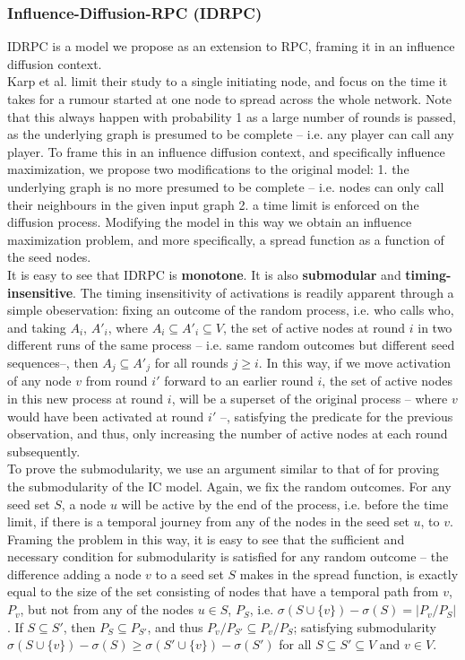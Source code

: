 \documentclass[twocolumn, 10pt]{article}
\begin{document}
\subsubsection{Influence-Diffusion-RPC (IDRPC)}
IDRPC is a model we propose as an extension to RPC, framing it in an influence diffusion context. \\
Karp et al. limit their study to a single initiating node, and focus on the time it takes for a rumour started at one node to spread across the whole network. Note that this always happen with probability 1 as a large number of rounds is passed, as the underlying graph is presumed to be complete -- i.e. any player can call any player. To frame this in an influence diffusion context, and specifically influence maximization, we propose two modifications to the original model: 1. the underlying graph is no more presumed to be complete -- i.e. nodes can only call their neighbours in the given input graph 2. a time limit is enforced on the diffusion process. Modifying the model in this way we obtain an influence maximization problem, and more specifically, a spread function as a function of the seed nodes. \\
It is easy to see that IDRPC is \textbf{monotone}. It is also \textbf{submodular} and \textbf{timing-insensitive}. The timing insensitivity of activations is readily apparent through a simple obeservation: fixing an outcome of the random process, i.e. who calls who, and taking $A_i$, $A'_i$, where $A_i \subseteq A'_i \subseteq V$, the set of active nodes at round $i$ in two different runs of the same process -- i.e. same random outcomes but different seed sequences--, then $A_j \subseteq A'_j$ for all rounds $j \geq i$. In this way, if we move activation of any node $v$ from round $i'$ forward to an earlier round $i$, the set of active nodes in this new process at round $i$, will be a superset of the original process -- where $v$ would have been activated at round $i'$ --, satisfying the predicate for the previous observation, and thus, only increasing the number of active nodes at each round subsequently. \\
To prove the submodularity, we use an argument similar to that of \cite{kempe} for proving the submodularity of the IC model. Again, we fix the random outcomes. For any seed set $S$, a node $u$ will be active by the end of the process, i.e. before the time limit, if there is a temporal journey from any of the nodes in the seed set $u$, to $v$. Framing the problem in this way, it is easy to see that the sufficient and necessary condition for submodularity is satisfied for any random outcome -- the difference adding a node $v$ to a seed set $S$ makes in the spread function, is exactly equal to the size of the set consisting of nodes that have a temporal path from $v$, $P_v$, but not from any of the nodes $u \in S$, $P_S$, i.e. $\sigma(S \cup \{v\}) - \sigma(S) = |P_v / P_S|$. If $S \subseteq S'$, then $P_S \subseteq P_{S'}$, and thus $P_v / P_{S'} \subseteq P_v / P_S$; satisfying submodularity $\sigma(S \cup \{v\}) - \sigma(S) \geq \sigma(S' \cup \{v\}) - \sigma(S')$ for all $S \subseteq S' \subseteq V$ and $v \in V$.
\end{document}
